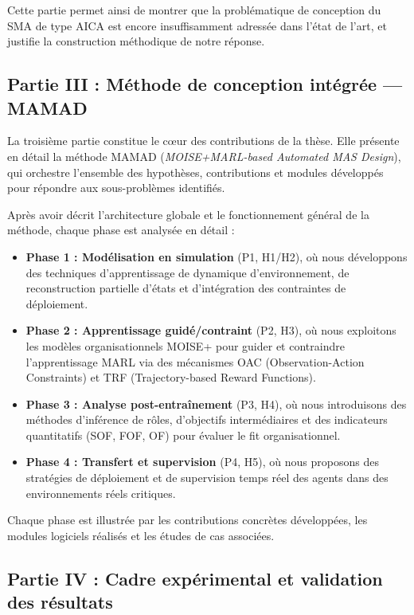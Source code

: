 \documentclass[ twoside,openright,titlepage,numbers=noenddot,headinclude,%
                footinclude=true,cleardoublepage=empty,abstractoff, %
                BCOR=5mm,paper=a4,fontsize=11pt,%
                french,american,%
                ]{scrreprt}
\begin{document}
Cette partie permet ainsi de montrer que la problématique de conception du SMA de type AICA est encore insuffisamment adressée dans l'état de l'art, et justifie la construction méthodique de notre réponse.

\subsection*{Partie III : Méthode de conception intégrée — MAMAD}

La troisième partie constitue le cœur des contributions de la thèse. Elle présente en détail la méthode MAMAD (\textit{MOISE+MARL-based Automated MAS Design}), qui orchestre l'ensemble des hypothèses, contributions et modules développés pour répondre aux sous-problèmes identifiés.

Après avoir décrit l'architecture globale et le fonctionnement général de la méthode, chaque phase est analysée en détail :

\begin{itemize}
    \item \textbf{Phase 1 : Modélisation en simulation} (P1, H1/H2), où nous développons des techniques d'apprentissage de dynamique d'environnement, de reconstruction partielle d'états et d'intégration des contraintes de déploiement.
    \item \textbf{Phase 2 : Apprentissage guidé/contraint} (P2, H3), où nous exploitons les modèles organisationnels MOISE+ pour guider et contraindre l'apprentissage MARL via des mécanismes OAC (Observation-Action Constraints) et TRF (Trajectory-based Reward Functions).
    \item \textbf{Phase 3 : Analyse post-entraînement} (P3, H4), où nous introduisons des méthodes d'inférence de rôles, d'objectifs intermédiaires et des indicateurs quantitatifs (SOF, FOF, OF) pour évaluer le fit organisationnel.
    \item \textbf{Phase 4 : Transfert et supervision} (P4, H5), où nous proposons des stratégies de déploiement et de supervision temps réel des agents dans des environnements réels critiques.
\end{itemize}

Chaque phase est illustrée par les contributions concrètes développées, les modules logiciels réalisés et les études de cas associées.

\subsection*{Partie IV : Cadre expérimental et validation des résultats}
\end{document}
